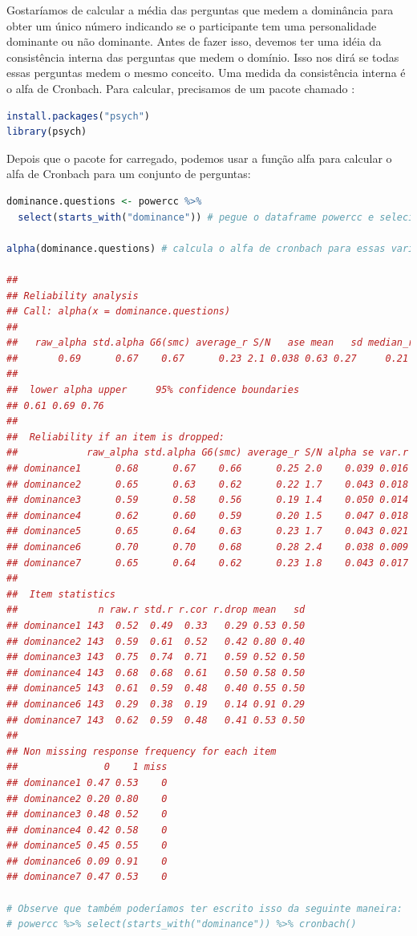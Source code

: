 \documentclass{article}
\begin{document}
Gostaríamos de calcular a média das perguntas que medem a dominância para obter um único número indicando se o participante tem uma personalidade dominante ou não dominante. Antes de fazer isso, devemos ter uma idéia da consistência interna das perguntas que medem o domínio. Isso nos dirá se todas essas perguntas medem o mesmo conceito. Uma medida da consistência interna é o alfa de Cronbach. Para calcular, precisamos de um pacote chamado :

\begin{lstlisting}[language=R]
install.packages("psych")
library(psych)
\end{lstlisting}

Depois que o pacote for carregado, podemos usar a função alfa para calcular o alfa de Cronbach para um conjunto de perguntas:

\begin{lstlisting}[language=R]
dominance.questions <- powercc %>% 
  select(starts_with("dominance")) # pegue o dataframe powercc e selecione todas as viariaveis com o nome que se inicia com dominancia

alpha(dominance.questions) # calcula o alfa de cronbach para essas variaveis

## 
## Reliability analysis   
## Call: alpha(x = dominance.questions)
## 
##   raw_alpha std.alpha G6(smc) average_r S/N   ase mean   sd median_r
##       0.69      0.67    0.67      0.23 2.1 0.038 0.63 0.27     0.21
## 
##  lower alpha upper     95% confidence boundaries
## 0.61 0.69 0.76 
## 
##  Reliability if an item is dropped:
##            raw_alpha std.alpha G6(smc) average_r S/N alpha se var.r med.r
## dominance1      0.68      0.67    0.66      0.25 2.0    0.039 0.016  0.22
## dominance2      0.65      0.63    0.62      0.22 1.7    0.043 0.018  0.21
## dominance3      0.59      0.58    0.56      0.19 1.4    0.050 0.014  0.20
## dominance4      0.62      0.60    0.59      0.20 1.5    0.047 0.018  0.21
## dominance5      0.65      0.64    0.63      0.23 1.7    0.043 0.021  0.21
## dominance6      0.70      0.70    0.68      0.28 2.4    0.038 0.009  0.25
## dominance7      0.65      0.64    0.62      0.23 1.8    0.043 0.017  0.20
## 
##  Item statistics 
##              n raw.r std.r r.cor r.drop mean   sd
## dominance1 143  0.52  0.49  0.33   0.29 0.53 0.50
## dominance2 143  0.59  0.61  0.52   0.42 0.80 0.40
## dominance3 143  0.75  0.74  0.71   0.59 0.52 0.50
## dominance4 143  0.68  0.68  0.61   0.50 0.58 0.50
## dominance5 143  0.61  0.59  0.48   0.40 0.55 0.50
## dominance6 143  0.29  0.38  0.19   0.14 0.91 0.29
## dominance7 143  0.62  0.59  0.48   0.41 0.53 0.50
## 
## Non missing response frequency for each item
##               0    1 miss
## dominance1 0.47 0.53    0
## dominance2 0.20 0.80    0
## dominance3 0.48 0.52    0
## dominance4 0.42 0.58    0
## dominance5 0.45 0.55    0
## dominance6 0.09 0.91    0
## dominance7 0.47 0.53    0

# Observe que também poderíamos ter escrito isso da seguinte maneira:
# powercc %>% select(starts_with("dominance")) %>% cronbach()
\end{lstlisting}
\end{document}
